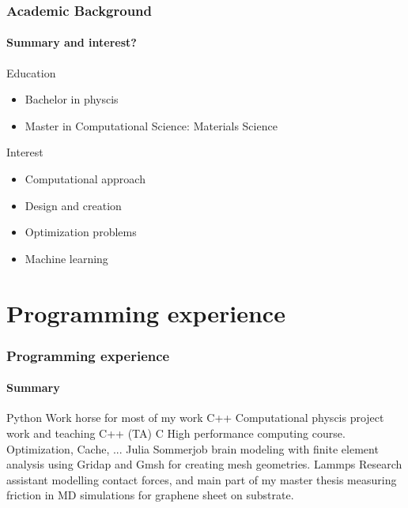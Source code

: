 \documentclass[
	10pt, %
]{beamer}
\begin{document}
\begin{frame}
	\frametitle{Academic Background}
	\framesubtitle{Summary and interest?}

	Education
	\begin{itemize}
		\item Bachelor in physcis 
		\item Master in Computational Science: Materials Science 
	\end{itemize}
	Interest
	\begin{itemize}
		\item Computational approach
		\item Design and creation 
		\item Optimization problems
		\item Machine learning 
	\end{itemize}
\end{frame}


\section{Programming experience}


\begin{frame}
	\frametitle{Programming experience}
	\framesubtitle{Summary}

	\begin{outline}
		\1 Python 
			\2 Work horse for most of my work
		\1 C++
			\2 Computational physcis project work and teaching C++ (TA)
		\1 C
			\2 High performance computing course. Optimization, Cache, ...
		\1 Julia
			\2 Sommerjob brain modeling with finite element analysis using Gridap and Gmsh for creating mesh geometries. 
		\1 Lammps
			\2 Research assistant modelling contact forces, and main part of my master thesis measuring friction in MD simulations for graphene sheet on substrate. 
	\end{outline}

\end{frame}
\end{document}
